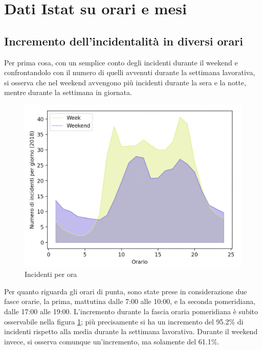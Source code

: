 \documentclass[a4paper]{report}
\begin{document}
\section{Dati Istat su orari e mesi}

\subsection{Incremento dell'incidentalità in diversi orari}

Per prima cosa, con un semplice conto degli incidenti durante il weekend 
e confrontandolo con il numero di quelli avvenuti durante la 
settimana lavorativa, si osserva che nel weekend avvengono più incidenti 
durante la sera e la notte, mentre durante la settimana in giornata.

\begin{figure}
    \includegraphics[width=\linewidth]{../src/incidenti/incidenti_senza_coords/ore_punta/week_weekend.png}
    \caption{Incidenti per ora}
    \label{fig:week-weekend}
\end{figure}

Per quanto riguarda gli orari di punta, sono state prese in considerazione due fasce orarie, la prima, 
mattutina dalle 7:00 alle 10:00, e la seconda pomeridiana, dalle 17:00 alle 19:00.
L'incremento durante la fascia oraria pomeridiana è subito osservabile nella figura 
\ref{fig:week-weekend}; più precisamente si 
ha un incremento del 95.2\% di incidenti rispetto alla media durante la settimana lavorativa. 
Durante il weekend invece, si osserva comunque un'incremento, ma solamente del 61.1\%.
\end{document}
